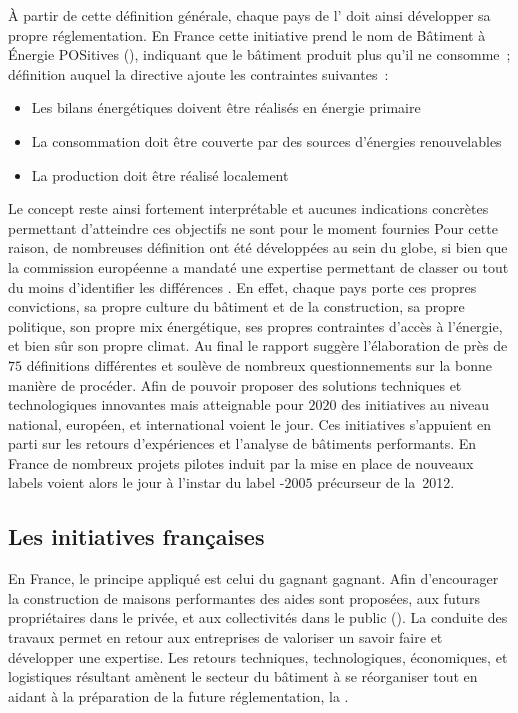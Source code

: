 À partir de cette définition générale, chaque pays de l’ doit ainsi développer sa
propre réglementation. En France cette initiative prend le nom de Bâtiment à
Énergie POSitives (), indiquant que le bâtiment produit plus qu’il ne consomme~; définition
auquel la directive ajoute les contraintes suivantes~:
\begin{itemize}
    \item Les bilans énergétiques doivent être réalisés en énergie primaire
    \item La consommation doit être couverte par des sources d’énergies renouvelables
    \item La production doit être réalisé localement
\end{itemize}
Le concept reste ainsi fortement interprétable et aucunes indications concrètes
permettant d’atteindre ces objectifs ne sont pour le moment fournies
Pour cette raison, de nombreuses définition ont été développées au sein du globe,
si bien que la commission européenne a mandaté une expertise permettant de classer ou
tout du moins d’identifier les différences \parencite{ECOFYS2013}. En effet, chaque pays
porte ces propres convictions, sa propre culture du bâtiment et de la construction, sa
propre politique, son propre mix énergétique, ses propres contraintes d’accès à l’énergie,
et bien sûr son propre climat.
Au final le rapport suggère l’élaboration de près de $75$ définitions différentes et
soulève de nombreux questionnements sur la bonne manière de procéder. Afin de pouvoir
proposer des solutions techniques et technologiques innovantes mais atteignable pour
$2020$ des initiatives au niveau national, européen, et international voient le jour.
Ces initiatives s’appuient en parti sur les retours d’expériences et l’analyse de bâtiments
performants. En France de nombreux projets pilotes induit par la mise
en place de nouveaux labels voient alors le jour à l’instar du label -$2005$
précurseur de la \,2012.


\subsection{Les initiatives françaises} %
\label{sub:les_initiatives_francaises}
En France, le principe appliqué est celui du gagnant gagnant. Afin d’encourager la
construction de maisons performantes des aides sont proposées, aux futurs propriétaires
dans le privée, et aux collectivités dans le public (). La conduite des travaux permet en retour aux entreprises de valoriser un
savoir faire et développer une expertise. Les retours techniques, technologiques,
économiques, et logistiques résultant amènent le secteur du bâtiment à se réorganiser tout
en aidant à la préparation de la future réglementation, la .

